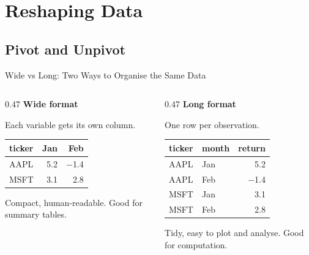 \documentclass[9pt,aspectratio=169]{beamer}
\begin{document}
\section{Reshaping Data}
\subsection{Pivot and Unpivot}

\begin{frame}{Wide vs Long: Two Ways to Organise the Same Data}

\begin{columns}[T]
\begin{column}{0.47\textwidth}
\textbf{Wide format}

Each variable gets its own column.

\medskip

\centering
\begin{tabular}{@{}lrr@{}}
\toprule
\textbf{ticker} & \textbf{Jan} & \textbf{Feb} \\
\midrule
AAPL & 5.2 & $-$1.4 \\
MSFT & 3.1 & 2.8 \\
\bottomrule
\end{tabular}

\bigskip

\raggedright
Compact, human-readable. Good for summary tables.
\end{column}
\begin{column}{0.47\textwidth}
\textbf{Long format}

One row per observation.

\medskip

\centering
\begin{tabular}{@{}llr@{}}
\toprule
\textbf{ticker} & \textbf{month} & \textbf{return} \\
\midrule
AAPL & Jan & 5.2 \\
AAPL & Feb & $-$1.4 \\
MSFT & Jan & 3.1 \\
MSFT & Feb & 2.8 \\
\bottomrule
\end{tabular}

\bigskip

\raggedright
Tidy, easy to plot and analyse. Good for computation.
\end{column}
\end{columns}

\bigskip


\end{frame}
\end{document}
